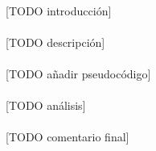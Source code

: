 \documentclass{subfiles}
\begin{document}
      \paragraph{}
      [TODO introducción]

      \paragraph{}
      [TODO descripción]

      \paragraph{}
      [TODO añadir pseudocódigo]

      \paragraph{}
      [TODO análisis]

      \paragraph{}
      [TODO comentario final]
\end{document}
